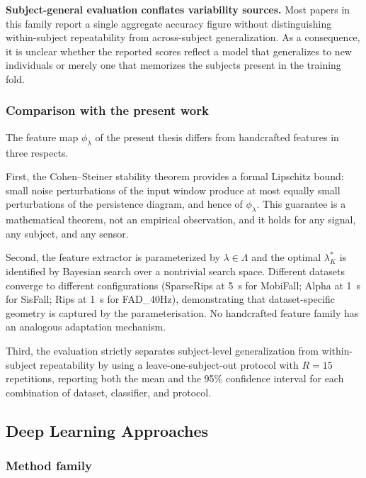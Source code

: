 \documentclass[onluarkali,ingilizce,yukseklisans,karton,LisansustuEgitim]{itutez}
\providecommand{\1}{\mathbf{1}}
\begin{document}
\textbf{Subject-general evaluation conflates variability sources.}  Most papers in
this family report a single aggregate accuracy figure without distinguishing
within-subject repeatability from across-subject generalization.  As a consequence,
it is unclear whether the reported scores reflect a model that generalizes to new
individuals or merely one that memorizes the subjects present in the training fold.

\subsubsection{Comparison with the present work}

The feature map $\phi_\lambda$ of the present thesis differs from handcrafted
features in three respects.

First, the Cohen--Steiner stability theorem provides a formal Lipschitz bound:
small noise perturbations of the input window produce at most equally small
perturbations of the persistence diagram, and hence of $\phi_\lambda$.  This
guarantee is a mathematical theorem, not an empirical observation, and it holds
for any signal, any subject, and any sensor.

Second, the feature extractor is parameterized by $\lambda\in\Lambda$ and the
optimal $\lambda^*_K$ is identified by Bayesian search over a nontrivial search
space.  Different datasets converge to different configurations (SparseRips at 5~s
for MobiFall; Alpha at 1~s for SisFall; Rips at 1~s for FAD\_40Hz), demonstrating
that dataset-specific geometry is captured by the parameterisation.  No handcrafted
feature family has an analogous adaptation mechanism.

Third, the evaluation strictly separates subject-level generalization from
within-subject repeatability by using a leave-one-subject-out protocol with
$R=15$ repetitions, reporting both the mean and the 95\% confidence interval
for each combination of dataset, classifier, and protocol.

\subsection{Deep Learning Approaches}
\label{subsec:rw-dl}

\subsubsection{Method family}
\end{document}
